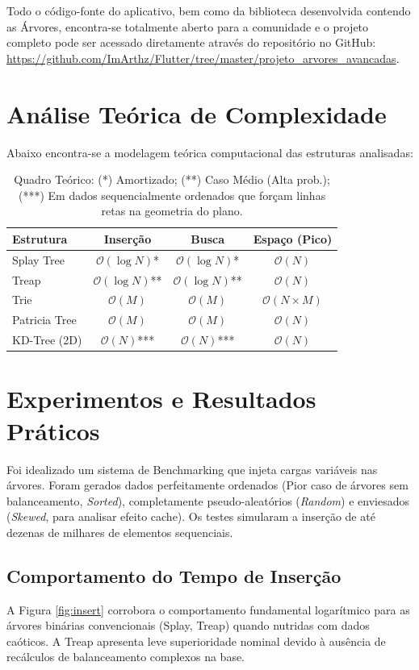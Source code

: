 \documentclass[12pt,a4paper]{article}
\begin{document}
Todo o código-fonte do aplicativo, bem como da biblioteca desenvolvida contendo as Árvores, encontra-se totalmente aberto para a comunidade e o projeto completo pode ser acessado diretamente através do repositório no GitHub: \\ \url{https://github.com/ImArthz/Flutter/tree/master/projeto_arvores_avancadas}.

\section{Análise Teórica de Complexidade}
Abaixo encontra-se a modelagem teórica computacional das estruturas analisadas:

\begin{table}[H]
\centering
\begin{tabular}{@{}lccc@{}}
\toprule
\textbf{Estrutura} & \textbf{Inserção} & \textbf{Busca} & \textbf{Espaço (Pico)} \\ \midrule
Splay Tree & $\mathcal{O}(\log N)$* & $\mathcal{O}(\log N)$* & $\mathcal{O}(N)$ \\
Treap & $\mathcal{O}(\log N)$** & $\mathcal{O}(\log N)$** & $\mathcal{O}(N)$ \\
Trie & $\mathcal{O}(M)$ & $\mathcal{O}(M)$ & $\mathcal{O}(N \times M)$ \\
Patricia Tree & $\mathcal{O}(M)$ & $\mathcal{O}(M)$ & $\mathcal{O}(N)$ \\
KD-Tree (2D) & $\mathcal{O}(N)$*** & $\mathcal{O}(N)$*** & $\mathcal{O}(N)$ \\ \bottomrule
\end{tabular}
\caption{Quadro Teórico: (*) Amortizado; (**) Caso Médio (Alta prob.); (***) Em dados sequencialmente ordenados que forçam linhas retas na geometria do plano.}
\end{table}

\section{Experimentos e Resultados Práticos}
Foi idealizado um sistema de Benchmarking que injeta cargas variáveis nas árvores. Foram gerados dados perfeitamente ordenados (Pior caso de árvores sem balanceamento, \textit{Sorted}), completamente pseudo-aleatórios (\textit{Random}) e enviesados (\textit{Skewed}, para analisar efeito cache). Os testes simularam a inserção de até dezenas de milhares de elementos sequenciais. 

\subsection{Comportamento do Tempo de Inserção}
A Figura \ref{fig:insert} corrobora o comportamento fundamental logarítmico para as árvores binárias convencionais (Splay, Treap) quando nutridas com dados caóticos. A Treap apresenta leve superioridade nominal devido à ausência de recálculos de balanceamento complexos na base.
\end{document}
